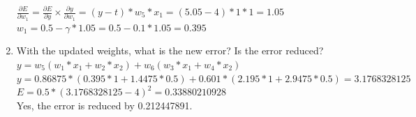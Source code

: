 \documentclass[conference]{IEEEtran}
\begin{document}
\begin{enumerate}
	$\frac{\partial E}{\partial w_1}=\frac{\partial E}{\partial y} \times \frac{\partial y}{\partial w_1}=(y-t)*w_5*x_1=(5.05-4)*1*1=1.05$\\
	$w_1 = 0.5 - \gamma*1.05 = 0.5-0.1*1.05=0.395$\\
    \item With the updated weights, what is the new error? Is the error reduced?\\
    $y = w_5(w_1 * x_1 + w_2 * x_2) + w_6 (w_3 * x_1 + w_4 * x_2)$\\
	$y = 0.86875*(0.395*1+1.4475*0.5)+0.601*(2.195*1+2.9475*0.5) = 3.1768328125$\\
	$E = 0.5 * (3.1768328125 - 4)^2 = 0.33880210928$\\
	Yes, the error is reduced by 0.212447891.

\end{enumerate}
\end{document}
